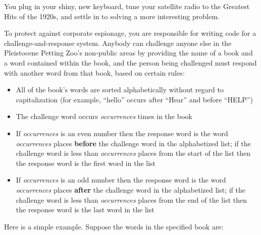 You plug in your shiny, new keyboard, tune your satellite radio to the
Greatest Hits of the 1920s, and settle in to solving a more interesting problem.

To protect against corporate espionage, you are responsible for writing code
for a challenge-and-response system. Anybody can challenge anyone else in the
Pleistocene Petting Zoo's non-public areas by providing the name of a book and
a word contained within the book, and the person being challenged must respond
with another word from that book, based on certain rules:
\begin{itemize}
\item All of the book's words are sorted alphabetically without regard to
    capitalization (for example, ``hello'' occurs after ``Hear'' and before
    ``HELP'')
\item The challenge word occurs \textit{occurrences} times in the book
\item If \textit{occurrences} is an even number then the response word is the
    word \textit{occurrences} places \textbf{before} the challenge word in the
    alphabetized list; if the challenge word is less than \textit{occurrences}
    places from the start of the list then the response word is the first word
    in the list
\item If \textit{occurrences} is an odd number then the response word is the
    word \textit{occurrences} places \textbf{after} the challenge word in the
    alphabetized list; if the challenge word is less than \textit{occurrences}
    places from the end of the list then the response word is the last word
    in the list
\end{itemize}

Here is a simple example. Suppose the words in the specified book are:

